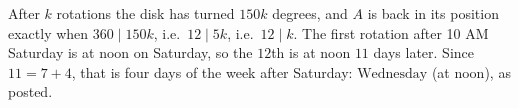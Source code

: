 After $k$ rotations the disk has turned $150k$ degrees, and $A$ is back in its position exactly when $360\mid150k$, i.e.\ $12\mid5k$, i.e.\ $12\mid k$. The first rotation after 10 AM Saturday is at noon on Saturday, so the $12$th is at noon $11$ days later. Since $11=7+4$, that is four days of the week after Saturday: $\boxed{\text{Wednesday}}$ (at noon), as posted.
